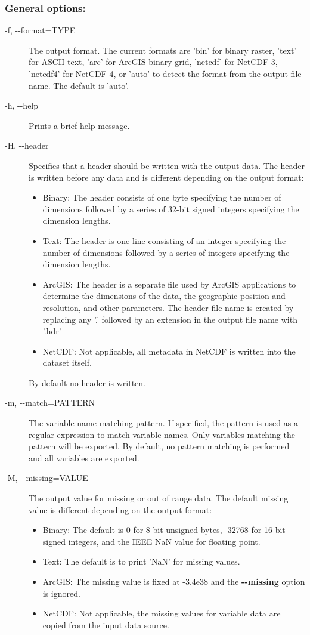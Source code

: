 \subsubsection*{General options:}
\begin{description}
\item[ -f, -{-}format=TYPE ] The output format. The current formats are 'bin' for binary raster, 'text' for ASCII text, 'arc' for ArcGIS binary grid, 'netcdf' for NetCDF 3, 'netcdf4' for NetCDF 4, or 'auto' to detect the format from the output file name. The default is 'auto'.
\item[ -h, -{-}help ] Prints a brief help message. 
\item[ -H, -{-}header ] Specifies that a header should be written with the output data. The header is written before any data and is different depending on the output format: \begin{itemize}
\item Binary: The header consists of one byte specifying the number of dimensions followed by a series of 32-bit signed integers specifying the dimension lengths.
\item Text: The header is one line consisting of an integer specifying the number of dimensions followed by a series of integers specifying the dimension lengths.
\item ArcGIS: The header is a separate file used by ArcGIS applications to determine the dimensions of the data, the geographic position and resolution, and other parameters. The header file name is created by replacing any '.' followed by an extension in the output file name with '.hdr'
\item NetCDF: Not applicable, all metadata in NetCDF is written into the dataset itself.

\end{itemize}
 By default no header is written. 
\item[ -m, -{-}match=PATTERN ] The variable name matching pattern. If specified, the pattern is used as a regular expression to match variable names. Only variables matching the pattern will be exported. By default, no pattern matching is performed and all variables are exported. 
\item[ -M, -{-}missing=VALUE ] The output value for missing or out of range data. The default missing value is different depending on the output format: \begin{itemize}
\item Binary: The default is 0 for 8-bit unsigned bytes, -32768 for 16-bit signed integers, and the IEEE NaN value for floating point.
\item Text: The default is to print 'NaN' for missing values.
\item ArcGIS: The missing value is fixed at -3.4e38 and the \textbf{-{-}missing}
 option is ignored.
\item NetCDF: Not applicable, the missing values for variable data are copied from the input data source.


\end{itemize}
\end{description}
